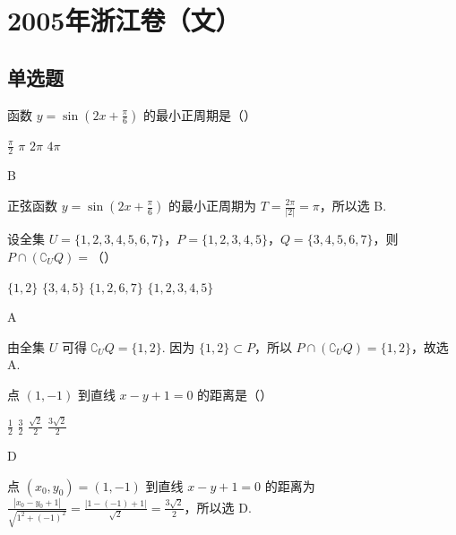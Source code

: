 \chapter{2005年浙江卷（文）}
\section{单选题}
\begin{problem}
函数 \( y = \sin \left(2x + \frac{\pi}{6}\right) \) 的最小正周期是（\quad）

\choices
    {\( \frac{\pi}{2} \)}
    {\(\pi\)}
    {\(2\pi\)}
    {\(4\pi\)}

\begin{answer}
B
\end{answer}

\begin{solution}
正弦函数 \(y=\sin(2x+\frac{\pi}{6})\) 的最小正周期为 \(T=\frac{2\pi}{|2|}=\pi\)，所以选 B.
\end{solution}
\end{problem}

\begin{problem}
设全集 \(U = \{1, 2, 3, 4, 5, 6, 7\}\)，\(P = \{1, 2, 3, 4, 5\}\)，\(Q = \{3, 4, 5, 6, 7\}\)，则 \(P \cap (\complement_U Q) =\)（\quad）

\choices
    {\(\{1,2\}\)}
    {\(\{3,4,5\}\)}
    {\(\{1,2,6,7\}\)}
    {\(\{1,2,3,4,5\}\)}

\begin{answer}
A
\end{answer}

\begin{solution}
由全集 \(U\) 可得 \(\complement_U Q=\{1,2\}\). 因为 \(\{1,2\}\subset P\)，所以 \(P\cap(\complement_U Q)=\{1,2\}\)，故选 A.
\end{solution}
\end{problem}

\begin{problem}
点 \((1, -1)\) 到直线 \(x - y + 1 = 0\) 的距离是（\quad）

\choices
    {\( \frac{1}{2} \)}
    {\( \frac{3}{2} \)}
    {\( \frac{\sqrt{2}}{2} \)}
    {\(\frac{3\sqrt{2}}{2}\)}

\begin{answer}
D
\end{answer}

\begin{solution}
点 \((x_0,y_0)=(1,-1)\) 到直线 \(x-y+1=0\) 的距离为
\(\displaystyle \frac{|x_0-y_0+1|}{\sqrt{1^2+(-1)^2}}=\frac{|1-(-1)+1|}{\sqrt{2}}=\frac{3\sqrt{2}}{2}\)，所以选 D.
\end{solution}
\end{problem}

